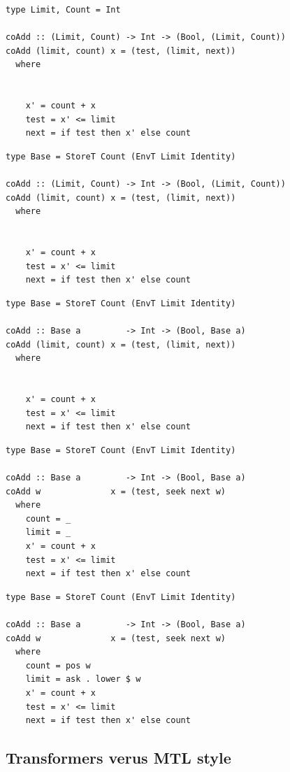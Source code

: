 \documentclass{beamer}
\begin{document}
\begin{frame}[fragile]
  \begin{overprint}
    \begin{verbatim}
type Limit, Count = Int

coAdd :: (Limit, Count) -> Int -> (Bool, (Limit, Count))
coAdd (limit, count) x = (test, (limit, next))
  where


    x' = count + x
    test = x' <= limit
    next = if test then x' else count
    \end{verbatim}
    \begin{verbatim}
type Base = StoreT Count (EnvT Limit Identity)

coAdd :: (Limit, Count) -> Int -> (Bool, (Limit, Count))
coAdd (limit, count) x = (test, (limit, next))
  where


    x' = count + x
    test = x' <= limit
    next = if test then x' else count
    \end{verbatim}
    \begin{verbatim}
type Base = StoreT Count (EnvT Limit Identity)

coAdd :: Base a         -> Int -> (Bool, Base a)
coAdd (limit, count) x = (test, (limit, next))
  where


    x' = count + x
    test = x' <= limit
    next = if test then x' else count
    \end{verbatim}
    \begin{verbatim}
type Base = StoreT Count (EnvT Limit Identity)

coAdd :: Base a         -> Int -> (Bool, Base a)
coAdd w              x = (test, seek next w)
  where
    count = _
    limit = _
    x' = count + x
    test = x' <= limit
    next = if test then x' else count
  \end{verbatim}
  \begin{verbatim}
type Base = StoreT Count (EnvT Limit Identity)

coAdd :: Base a         -> Int -> (Bool, Base a)
coAdd w              x = (test, seek next w)
  where
    count = pos w
    limit = ask . lower $ w
    x' = count + x
    test = x' <= limit
    next = if test then x' else count
  \end{verbatim}
  \end{overprint}
\end{frame}


\subsection{Transformers verus MTL style}
\end{document}
